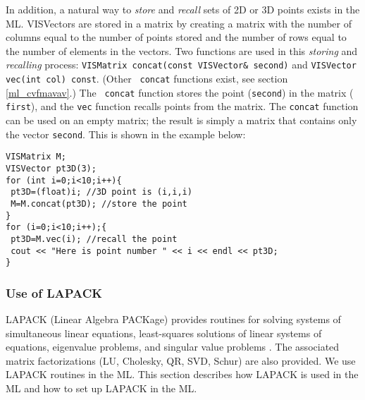 In addition, a natural way to {\em store} and {\em recall} sets of 2D 
or 3D points exists in the ML.  VISVectors are stored in a matrix by 
creating a matrix with the number of columns equal to the number of 
points stored and the number of rows equal to the number of elements 
in the vectors.  Two functions are used in this {\em storing} and {\em 
recalling} process: {\tt VISMatrix concat(const 
VISVector\& second)} and {\tt VISVector vec(int col) const}.  (Other {\tt 
concat} functions exist, see section \ref{ml_cvfmavav}.) The {\tt 
concat} function stores the point ({\tt second}) in the matrix ({\tt 
first}), and the {\tt vec} function recalls points from the matrix.  
The {\tt concat} function can be used on an empty matrix; the result 
is simply a matrix that contains only the vector {\tt second}.  This 
is shown in the example below:
\begin{list}{}{\setlength{\partopsep}{-1in}
\setlength{\topsep}{0in} \setlength{\labelwidth}{1in}
\setlength{\leftmargin}{0.5in} \setlength{\labelsep}{0.2in}}
 \item {\tt VISMatrix M;}\\
{\tt VISVector pt3D(3);}\\
{\tt for (int i=0;i<10;i++)\{ }\\
{\tt \hspace*{0.25in} pt3D=(float)i; //3D point is (i,i,i)}\\
{\tt \hspace*{0.25in} M=M.concat(pt3D); //store the point}\\
{\tt \} }\\
{\tt for (i=0;i<10;i++);\{ }\\
{\tt \hspace*{0.25in} pt3D=M.vec(i); //recall the point}\\
{\tt \hspace*{0.25in} cout << "Here is point number " << i
<< endl << pt3D;}\\
{\tt \} }
\end{list}

\subsubsection{Use of LAPACK}
\label{lapack}
LAPACK (Linear Algebra PACKage) provides routines for solving systems 
of simultaneous linear equations, least-squares solutions of linear 
systems of equations, eigenvalue problems, and singular value problems 
\cite{lapack}.  The associated matrix factorizations (LU, Cholesky, 
QR, SVD, Schur) are also provided.  We use LAPACK routines in the ML.  
This section describes how LAPACK is used in the ML and how to set up 
LAPACK in the ML.


